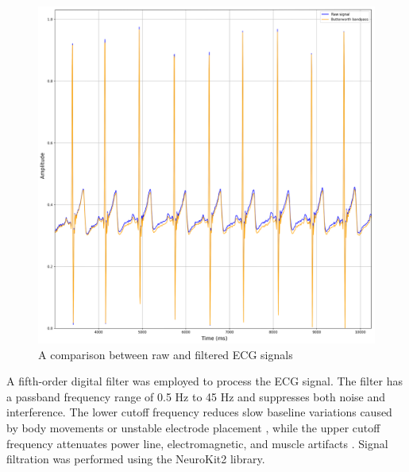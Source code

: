\documentclass{citask}
\begin{document}
\begin{figure}[htbp]
    \centering
    \includegraphics[width=0.76\linewidth]{images/Filtr_EKG.png} 
    \caption{A comparison between raw and filtered ECG signals}
    \label{fig:filtr_ekg}
\end{figure}

A fifth-order digital filter was employed to process the ECG signal. The filter has a passband frequency range of 0.5 Hz to 45 Hz and suppresses both noise and interference. The lower cutoff frequency reduces slow baseline variations caused by body movements or unstable electrode placement \cite{24}, while the upper cutoff frequency attenuates power line, electromagnetic, and muscle artifacts \cite{25}. Signal filtration was performed using the NeuroKit2 library.
\end{document}
